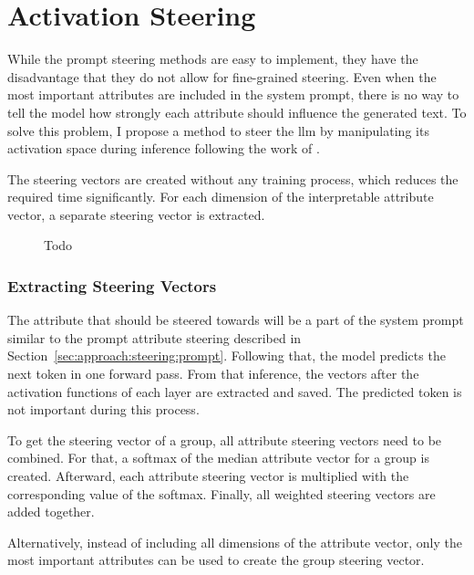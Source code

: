 \section{Activation Steering}

While the prompt steering methods are easy to implement, they have the disadvantage that they do not allow for fine-grained steering. Even when the most important attributes are included in the system prompt, there is no way to tell the model how strongly each attribute should influence the generated text. To solve this problem, I propose a method to steer the \ac{llm} by manipulating its activation space during inference following the work of \citet{turnerActivationAdditionSteering2024,rimsky-etal-2024-steering}.

The steering vectors are created without any training process, which reduces the required time significantly. For each dimension of the interpretable attribute vector, a separate steering vector is extracted.

\begin{figure}[ht]
  
  \label{fig:activationSteering}
  \caption{Todo}
\end{figure}

\subsubsection{Extracting Steering Vectors}
The attribute that should be steered towards will be a part of the system prompt similar to the prompt attribute steering described in Section~\ref{sec:approach:steering:prompt}. Following that, the model predicts the next token in one forward pass. From that inference, the vectors after the activation functions of each layer are extracted and saved. The predicted token is not important during this process. %

To get the steering vector of a group, all attribute steering vectors need to be combined. For that, a softmax of the median attribute vector for a group is created. Afterward, each attribute steering vector is multiplied with the corresponding value of the softmax. Finally, all weighted steering vectors are added together.

Alternatively, instead of including all dimensions of the attribute vector, only the most important attributes can be used to create the group steering vector.

